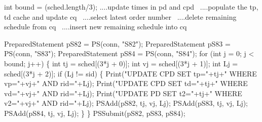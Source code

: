 \documentclass{article}
\def\nwendcode{\endtrivlist \endgroup}      %
\let\nwdocspar=\par
\theoremstyle{definition}                   %
\begin{document}
\nwenddocs{}\endmoddef{}
int bound = (sched.length/3);
\LA{}....update times in pd and cpd~{\nwtagstyle{}}\RA{}
\LA{}....populate the tp, td cache and update cq~{\nwtagstyle{}}\RA{}
\LA{}....select latest order number~{\nwtagstyle{}}\RA{}
\LA{}....delete remaining schedule from cq~{\nwtagstyle{}}\RA{}
\LA{}....insert new remaining schedule into cq~{\nwtagstyle{}}\RA{}
\nwendcode{}\nwdocspar
\nwenddocs{}\endmoddef{}
PreparedStatement pS82 = PS(conn, "S82");
PreparedStatement pS83 = PS(conn, "S83");
PreparedStatement pS84 = PS(conn, "S84");
for (int j = 0; j < bound; j++) \{
  int tj = sched[(3*j + 0)];
  int vj = sched[(3*j + 1)];
  int Lj = sched[(3*j + 2)];
  if (Lj != sid) \{
    Print("UPDATE CPD SET tp="+tj+" WHERE vp="+vj+" AND rid="+Lj);
    Print("UPDATE CPD SET td="+tj+" WHERE vd="+vj+" AND rid="+Lj);
    Print("UPDATE PD SET t2="+tj+" WHERE v2="+vj+" AND rid="+Lj);
    PSAdd(pS82, tj, vj, Lj);
    PSAdd(pS83, tj, vj, Lj);
    PSAdd(pS84, tj, vj, Lj);
  \}
\}
PSSubmit(pS82, pS83, pS84);
\nwendcode{}\nwdocspar
\nwenddocs{}\endmoddef{}
\end{document}
